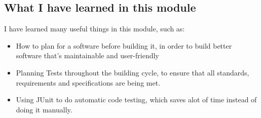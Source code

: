 \subsection{What I have learned in this module}
I have learned many useful things in this module, such as:
\begin{itemize}
\item How to plan for a software before building it, in order to build better software that's maintainable and user-friendly
\item Planning Tests throughout the building cycle, to ensure that all standards, requirements and specifications are being met.
\item Using JUnit to do automatic code testing, which saves alot of time instead of doing it manually.
\end{itemize}
